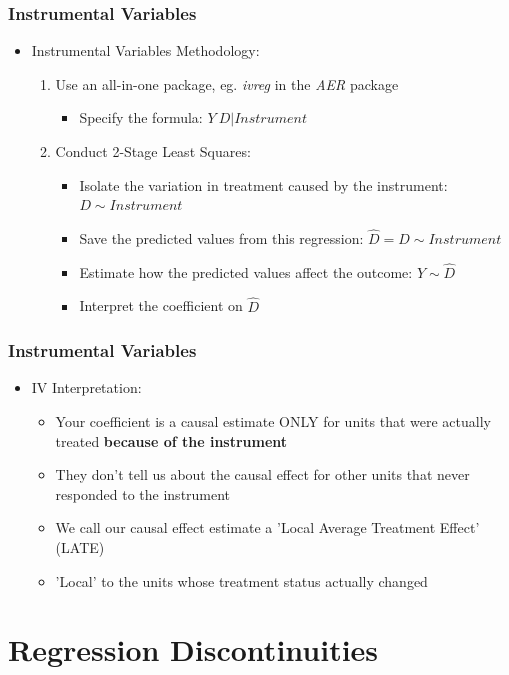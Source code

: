 \documentclass[xcolor=x11names,compress]{beamer}\usepackage[]{graphicx}\usepackage[]{xcolor}
\renewcommand{\(}{\begin{columns}}
\renewcommand{\)}{\end{columns}}
\newcommand{\<}[1]{\begin{column}{#1}}
\renewcommand{\>}{\end{column}}
\begin{document}
\begin{frame}
\frametitle{Instrumental Variables}
\begin{itemize}
\item Instrumental Variables Methodology:
\pause
\begin{enumerate}
\item Use an all-in-one package, eg. \textit{ivreg} in the \textit{AER} package
\begin{itemize}
\item Specify the formula: $Y ~ D | Instrument$
\pause
\end{itemize}
\item Conduct 2-Stage Least Squares: 
\pause
\begin{itemize}
\item Isolate the variation in treatment caused by the instrument: $D \sim Instrument$
\pause
\item Save the predicted values from this regression: $\hat{D} = D \sim Instrument$
\pause
\item Estimate how the predicted values affect the outcome: $Y \sim \hat{D}$
\pause
\item Interpret the coefficient on $\hat{D}$
\end{itemize}
\end{enumerate}
\end{itemize}
\end{frame}

\begin{frame}
\frametitle{Instrumental Variables}
\begin{itemize}
\item IV Interpretation:
\pause
\begin{itemize}
\item Your coefficient is a causal estimate ONLY for units that were actually treated \textbf{because of the instrument}
\pause
\item They don't tell us about the causal effect for other units that never responded to the instrument
\pause
\item We call our causal effect estimate a 'Local Average Treatment Effect' (LATE)
\item 'Local' to the units whose treatment status actually changed
\end{itemize}
\end{itemize}
\end{frame}



\section{Regression Discontinuities}
\end{document}
